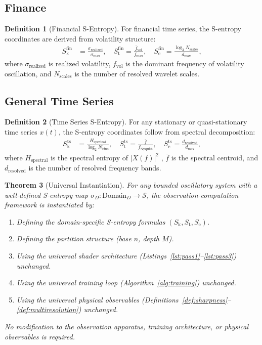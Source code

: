 \documentclass[11pt,twocolumn,a4paper]{article}
\newtheorem{theorem}{Theorem}[section]
\theoremstyle{definition}
\newtheorem{definition}[theorem]{Definition}
\theoremstyle{remark}
\newcommand{\Sk}{S_{\mathrm{k}}}
\newcommand{\St}{S_{\mathrm{t}}}
\newcommand{\Se}{S_{\mathrm{e}}}
\newcommand{\Sspace}{\mathcal{S}}
\begin{document}
\subsection{Finance}

\begin{definition}[Financial S-Entropy]
For financial time series, the S-entropy coordinates are derived from volatility structure:
\begin{align}
\Sk^{\mathrm{fin}} &= \frac{\sigma_{\mathrm{realized}}}{\sigma_{\max}}, \quad \St^{\mathrm{fin}} = \frac{\bar{f}_{\mathrm{vol}}}{{f}_{\max}}, \quad \Se^{\mathrm{fin}} = \frac{\log_3 N_{\mathrm{scales}}}{d_{\max}},
\end{align}
where $\sigma_{\mathrm{realized}}$ is realized volatility, $f_{\mathrm{vol}}$ is the dominant frequency of volatility oscillation, and $N_{\mathrm{scales}}$ is the number of resolved wavelet scales.
\end{definition}

\subsection{General Time Series}

\begin{definition}[Time Series S-Entropy]
For any stationary or quasi-stationary time series $x(t)$, the S-entropy coordinates follow from spectral decomposition:
\begin{align}
\Sk^{\mathrm{ts}} &= \frac{H_{\mathrm{spectral}}}{\log_2 N_{\mathrm{bins}}}, \quad \St^{\mathrm{ts}} = \frac{\bar{f}}{{f}_{\mathrm{Nyquist}}}, \quad \Se^{\mathrm{ts}} = \frac{d_{\mathrm{resolved}}}{d_{\max}},
\end{align}
where $H_{\mathrm{spectral}}$ is the spectral entropy of $|X(f)|^2$ \citep{shannon1948}, $\bar{f}$ is the spectral centroid, and $d_{\mathrm{resolved}}$ is the number of resolved frequency bands.
\end{definition}

\begin{theorem}[Universal Instantiation]
\label{thm:universal_instantiation}
For any bounded oscillatory system with a well-defined S-entropy map $\sigma_D: \text{Domain}_D \to \Sspace$, the observation-computation framework is instantiated by:
\begin{enumerate}[nosep]
\item Defining the domain-specific S-entropy formulas $(\Sk, \St, \Se)$.
\item Defining the partition structure (base $n$, depth $M$).
\item Using the universal shader architecture (Listings~\ref{lst:pass1}--\ref{lst:pass3}) unchanged.
\item Using the universal training loop (Algorithm~\ref{alg:training}) unchanged.
\item Using the universal physical observables (Definitions~\ref{def:sharpness}--\ref{def:multiresolution}) unchanged.
\end{enumerate}
No modification to the observation apparatus, training architecture, or physical observables is required.
\end{theorem}
\end{document}
